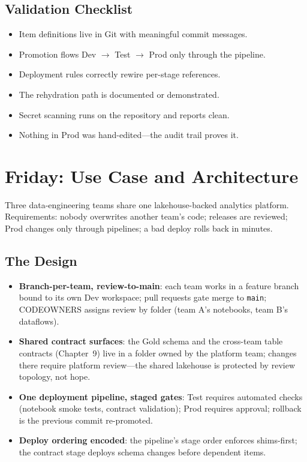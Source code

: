 \subsection{Validation Checklist}
\begin{itemize}
    \item Item definitions live in Git with meaningful commit messages.
    \item Promotion flows Dev $\rightarrow$ Test $\rightarrow$ Prod only through the pipeline.
    \item Deployment rules correctly rewire per-stage references.
    \item The rehydration path is documented or demonstrated.
    \item Secret scanning runs on the repository and reports clean.
    \item Nothing in Prod was hand-edited---the audit trail proves it.
\end{itemize}

\section{Friday: Use Case and Architecture}
Three data-engineering teams share one lakehouse-backed analytics platform. Requirements: nobody overwrites another team's code; releases are reviewed; Prod changes only through pipelines; a bad deploy rolls back in minutes.

\subsection{The Design}
\begin{itemize}
    \item \textbf{Branch-per-team, review-to-main}: each team works in a feature branch bound to its own Dev workspace; pull requests gate merge to \texttt{main}; CODEOWNERS assigns review by folder (team A's notebooks, team B's dataflows).
    \item \textbf{Shared contract surfaces}: the Gold schema and the cross-team table contracts (Chapter~9) live in a folder owned by the platform team; changes there require platform review---the shared lakehouse is protected by review topology, not hope.
    \item \textbf{One deployment pipeline, staged gates}: Test requires automated checks (notebook smoke tests, contract validation); Prod requires approval; rollback is the previous commit re-promoted.
    \item \textbf{Deploy ordering encoded}: the pipeline's stage order enforces shims-first; the contract stage deploys schema changes before dependent items.
\end{itemize}

